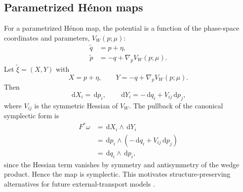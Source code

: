 \documentclass[11pt,a4paper]{article}
\providecommand{\dd}{\,\mathrm{d}}
\begin{document}
\begin{sloppypar}
\subsection{Parametrized H\'enon maps}
For a parametrized H\'enon map, the potential is a function of the phase-space coordinates and parameters, $V_W(p;\mu)$:
\begin{equation}
\begin{aligned}
    \widetilde{q}&=p+\eta,\\
    \widetilde{p}&=-q+\nabla_pV_W(p;\mu).
\end{aligned}
\end{equation}
Let $\widetilde{\xi}=(X,Y)$ with
\begin{equation}
    X=p+\eta,\qquad Y=-q+\nabla_pV_W(p;\mu).
\end{equation}
Then
\begin{equation}
    \dd X_i=\dd p_i,
    \qquad
    \dd Y_i=-\dd q_i+V_{ij}\dd p_j,
\end{equation}
where $V_{ij}$ is the symmetric Hessian of $V_W$. The pullback of the canonical symplectic form is
\begin{equation}
\begin{aligned}
    F^*\omega
    &=
    \dd X_i\wedge \dd Y_i\\
    &=
    \dd p_i\wedge(-\dd q_i+V_{ij}\dd p_j)\\
    &=
    \dd q_i\wedge\dd p_i,
\end{aligned}
\end{equation}
since the Hessian term vanishes by symmetry and antisymmetry of the wedge product. Hence the map is symplectic. This motivates structure-preserving alternatives for future external-transport models \cite{burby_fast_2020,huang_symplectic_2024}.


\end{sloppypar}
\end{document}
